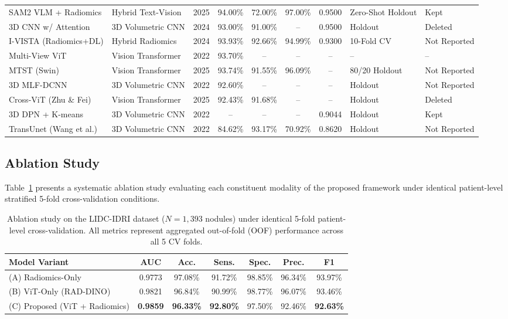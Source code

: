 \documentclass{iopjournal}
\begin{document}
\begin{longtable}{p{3.2cm} p{2.1cm} c c c c c p{1.8cm} p{1.7cm}}
SAM2 VLM + Radiomics & Hybrid Text-Vision & 2025 & 94.00\% & 72.00\% & 97.00\%
& 0.9500 & Zero-Shot Holdout & Kept \\
3D CNN w/ Attention & 3D Volumetric CNN & 2024 & 93.00\% & 91.00\% & -- &
0.9500 & Holdout & Deleted \\
I-VISTA (Radiomics+DL) & Hybrid Radiomics & 2024 & 93.93\% & 92.66\% & 94.99\%
& 0.9300 & 10-Fold CV & Not Reported \\
Multi-View ViT & Vision Transformer & 2022 & 93.70\% & -- & -- & -- & -- & -- \\
MTST (Swin) & Vision Transformer & 2025 & 93.74\% & 91.55\% & 96.09\% & -- &
80/20 Holdout & Not Reported \\
3D MLF-DCNN & 3D Volumetric CNN & 2022 & 92.60\% & -- & -- & -- & Holdout &
Not Reported \\
Cross-ViT (Zhu \& Fei) & Vision Transformer & 2025 & 92.43\% & 91.68\% & -- &
-- & Holdout & Deleted \\
3D DPN + K-means & 3D Volumetric CNN & 2022 & -- & -- & -- & 0.9044 & Holdout &
Kept \\
TransUnet (Wang et al.) & 3D Volumetric CNN & 2022 & 84.62\% & 93.17\% &
70.92\% & 0.8620 & Holdout & Not Reported \\
\end{longtable}

\subsection{\texorpdfstring{{\color{revblue}Ablation Study}}{Ablation Study}}

{\color{revblue}Table~\ref{tab:ablation} presents a systematic ablation study evaluating each
constituent modality of the proposed framework under identical patient-level
stratified 5-fold cross-validation conditions.}

\begin{table}[h]
\color{revblue}
\centering
\caption{Ablation study on the LIDC-IDRI dataset ($N=1{,}393$ nodules) under
identical 5-fold patient-level cross-validation. All metrics represent
aggregated out-of-fold (OOF) performance across all 5 CV
folds.}\label{tab:ablation}
\begin{tabular}{lcccccc}
\toprule
\textbf{Model Variant} & \textbf{AUC} & \textbf{Acc.} & \textbf{Sens.} &
\textbf{Spec.} & \textbf{Prec.} & \textbf{F1} \\
\midrule
(A) Radiomics-Only & 0.9773 & 97.08\% & 91.72\% & 98.85\% & 96.34\% & 93.97\% \\
(B) ViT-Only (RAD-DINO) & 0.9821 & 96.84\% & 90.99\% & 98.77\% & 96.07\% & 93.46\% \\
(C) Proposed (ViT + Radiomics) & \textbf{0.9859} & \textbf{96.33\%} &
\textbf{92.80\%} & 97.50\% & 92.46\% & \textbf{92.63\%} \\
\bottomrule
\end{tabular}
\end{table}
\end{document}
